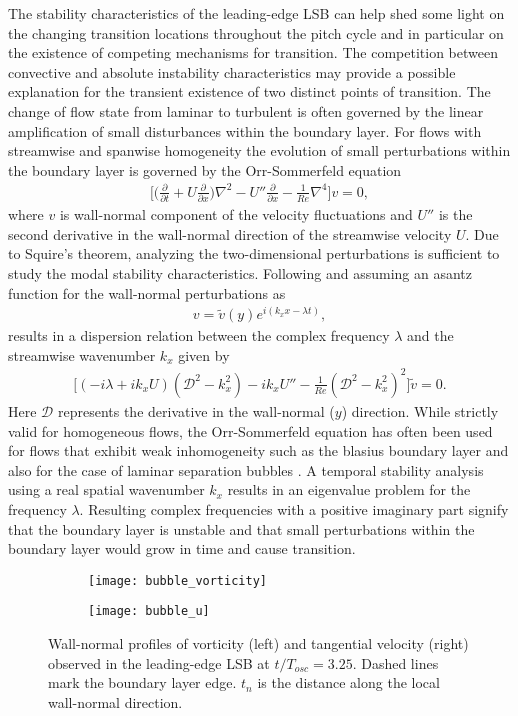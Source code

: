 The stability characteristics of the leading-edge LSB can help shed some light on the changing transition locations throughout the pitch cycle and in particular on the existence of competing mechanisms for transition. The competition between convective and absolute instability characteristics may provide a possible explanation for the transient existence of two distinct points of transition. The change of flow state from laminar to turbulent is often governed by the linear amplification of small disturbances within the boundary layer. For flows with streamwise and spanwise homogeneity the evolution of small perturbations within the boundary layer is governed by the Orr-Sommerfeld equation
\begin{align}
	\bigg[\big(\frac{\partial}{\partial t} + U\frac{\partial}{\partial x}\big)\nabla^{2} - U''\frac{\partial}{\partial x} - \frac{1}{Re}\nabla^{4}	\bigg]v = 0,
\end{align}
where $v$ is wall-normal component of the velocity fluctuations and $U''$ is the second derivative in the wall-normal direction of the streamwise velocity $U$. Due to Squire's theorem, analyzing the two-dimensional perturbations is sufficient to study the modal stability characteristics. Following \cite{schmid01} and assuming an asantz function for the wall-normal perturbations as
\begin{align}
	v = \tilde{v}(y)e^{i(k_{x}x - \lambda t)},
\end{align}	
results in a dispersion relation between the complex frequency $\lambda$ and the streamwise wavenumber $k_{x}$ given by
\begin{align}
	\bigg[(-i\lambda + ik_{x}U)(\mathcal{D}^{2} - k_{x}^{2}) - ik_{x}U'' - \frac{1}{Re}(\mathcal{D}^{2} - k_{x}^2)^{2}\bigg]\tilde{v} = 0.
	\label{eqn:orr-somerfeld}
\end{align}
Here $\mathcal{D}$ represents the derivative in the wall-normal ($y$) direction. While strictly valid for homogeneous flows, the Orr-Sommerfeld equation has often been used for flows that exhibit weak inhomogeneity such as the blasius boundary layer and also for the case of laminar separation bubbles \citep{alam00,hammond98,haggmark01b}. A temporal stability analysis using a real spatial wavenumber $k_{x}$ results in an eigenvalue problem for the frequency $\lambda$. Resulting complex frequencies with a positive imaginary part signify that the boundary layer is unstable and that small perturbations within the boundary layer would grow in time and cause transition. 
\begin{figure}[h]
	\centering
	\begin{subfigure}[t]{0.48\textwidth}
		\centering
		\texttt{[image: bubble\_vorticity]}
	\end{subfigure}
	\begin{subfigure}[t]{0.48\textwidth}
		\centering
		\texttt{[image: bubble\_u]}
	\end{subfigure}
	\caption{Wall-normal profiles of vorticity (left) and tangential velocity (right) observed in the leading-edge LSB at $t/T_{osc}=3.25$. Dashed lines mark the boundary layer edge. $t_{n}$ is the distance along the local wall-normal direction.}
	\label{fig:bubble_profiles}
\end{figure}

